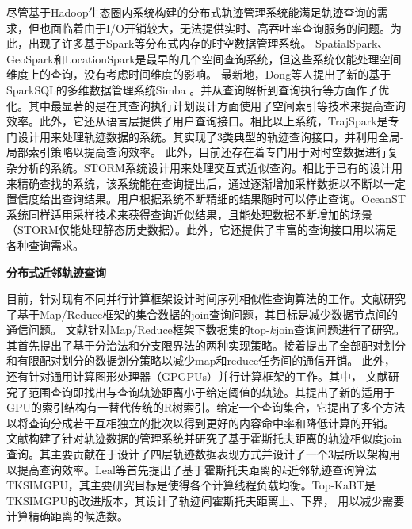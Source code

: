 尽管基于Hadoop生态圈内系统构建的分布式轨迹管理系统能满足轨迹查询的需求，但也面临着由于I/O开销较大，无法提供实时、高吞吐率查询服务的问题。为此，出现了许多基于Spark等分布式内存的时空数据管理系统。
SpatialSpark\cite{SpatialSpark}、GeoSpark\cite{GeoSpark}和LocationSpark\cite{Locationspark}是最早的几个空间查询系统，但这些系统仅能处理空间维度上的查询，没有考虑时间维度的影响。
最新地，Dong等人提出了新的基于SparkSQL的多维数据管理系统Simba \cite{Simba}。并从查询解析到查询执行等方面作了优化。其中最显著的是在其查询执行计划设计方面使用了空间索引等技术来提高查询效率。此外，它还从语言层提供了用户查询接口。相比以上系统，TrajSpark\cite{TrajSpark}是专门设计用来处理轨迹数据的系统。其实现了3类典型的轨迹查询接口，并利用全局-局部索引策略以提高查询效率。
此外，目前还存在着专门用于对时空数据进行复杂分析的系统\cite{OceanST,STORM}。STORM\cite{STORM}系统设计用来处理交互式近似查询。相比于已有的设计用来精确查找的系统，该系统能在查询提出后，通过逐渐增加采样数据以不断以一定置信度给出查询结果。用户根据系统不断精细的结果随时可以停止查询。OceanST\cite{OceanST}系统同样适用采样技术来获得查询近似结果，且能处理数据不断增加的场景（STORM仅能处理静态历史数据）。此外，它还提供了丰富的查询接口用以满足各种查询需求。



\textbf{分布式近邻轨迹查询}

目前，针对现有不同并行计算框架设计时间序列相似性查询算法的工作。文献\cite{kimICDE2012}研究了基于Map/Reduce框架的集合数据的join查询问题，其目标是减少数据节点间的通信问题。
文献\cite{kimICDE2012}针对Map/Reduce框架下数据集的top-$k$join查询问题进行了研究。其首先提出了基于分治法和分支限界法的两种实现策略。接着提出了全部配对划分和有限配对划分的数据划分策略以减少map和reduce任务间的通信开销。
此外，还有针对通用计算图形处理器（GPGPUs）并行计算框架的工作\cite{GowanlockC14,Zhang2012U2STRA,LealGZY15}。其中，
文献\cite{GowanlockC14}研究了范围查询即找出与查询轨迹距离小于给定阈值的轨迹。其提出了新的适用于GPU的索引结构有一替代传统的R树索引。给定一个查询集合，它提出了多个方法以将查询分成若干互相独立的批次以得到更好的内容命中率和降低计算的开销。
文献\cite{Zhang2012U2STRA}构建了针对轨迹数据的管理系统并研究了基于霍斯托夫距离的轨迹相似度join查询。其主要贡献在于设计了四层轨迹数据表现方式并设计了一个3层所以架构用以提高查询效率。Leal等\cite{LealGZY15}首先提出了基于霍斯托夫距离的$k$近邻轨迹查询算法TKSIMGPU，其主要研究目标是使得各个计算线程负载均衡。Top-KaBT\cite{LealGZY16}是TKSIMGPU的改进版本，其设计了轨迹间霍斯托夫距离上、下界， 用以减少需要计算精确距离的候选数。

